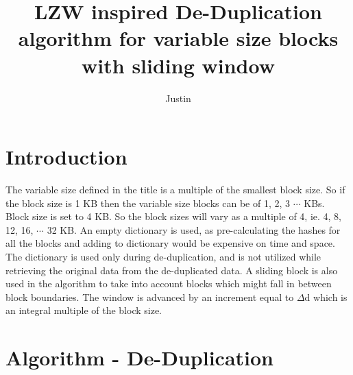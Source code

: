 \documentclass{article}
\title{LZW inspired De-Duplication algorithm for variable size blocks with sliding window}
\author{Justin}
\date{}
\begin{document}
   \maketitle
   \section{Introduction}
   The variable size defined in the title is a multiple of the smallest block size. So if the block size is 1 KB then the variable size blocks can be of 1, 2, 3 $\cdots$ KBs. Block size is set to 4 KB. So the block sizes will vary as a multiple of 4, ie. 4, 8, 12, 16, $\cdots$ 32 KB. An empty dictionary is used, as pre-calculating the hashes for all the blocks and adding to dictionary would be expensive on time and space. The dictionary is used only during de-duplication, and is not utilized while retrieving the original data from the de-duplicated data. A sliding block is also used in the algorithm to take into account blocks which might fall in between block boundaries. The window is advanced by an increment equal to $\Delta$d which is an integral multiple of the block size.
   \section{Algorithm - De-Duplication}
   
\end{document}
